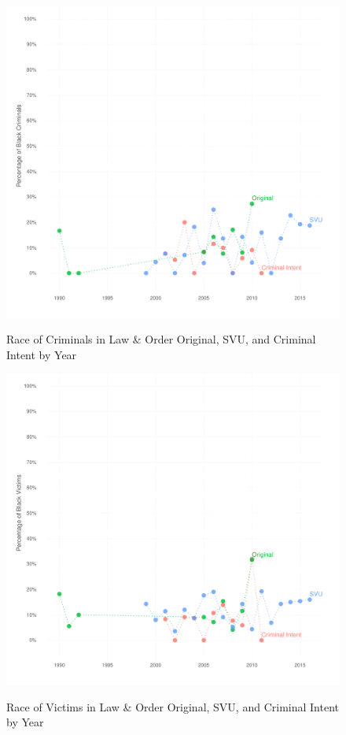 \documentclass[12pt, letterpaper]{article}
\begin{document}
\begin{figure}[htbp]
\centering
\caption{Race of Criminals in Law \& Order Original, SVU, and Criminal Intent by Year}
\includegraphics[scale=.9]{../figs/all_criminals_by_race_ts.pdf}
\label{fig:perp_race_ts}
\end{figure}

\begin{figure}[htbp]
\centering
\caption{Race of Victims in Law \& Order Original, SVU, and Criminal Intent by Year}
\includegraphics[scale=.9]{../figs/all_victims_by_race_ts.pdf}
\label{fig:victim_race_ts}
\end{figure}
\end{document}
